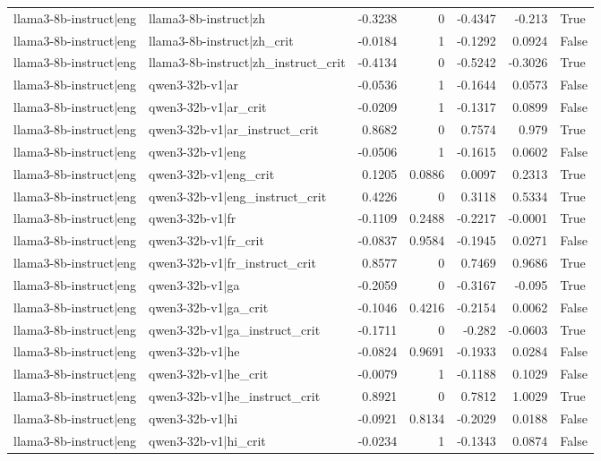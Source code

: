 \begin{table}
\begin{tabular}{l l r r r r l}
llama3-8b-instruct|eng & llama3-8b-instruct|zh & -0.3238 & 0 & -0.4347 & -0.213 & True \\
llama3-8b-instruct|eng & llama3-8b-instruct|zh_crit & -0.0184 & 1 & -0.1292 & 0.0924 & False \\
llama3-8b-instruct|eng & llama3-8b-instruct|zh_instruct_crit & -0.4134 & 0 & -0.5242 & -0.3026 & True \\
llama3-8b-instruct|eng & qwen3-32b-v1|ar & -0.0536 & 1 & -0.1644 & 0.0573 & False \\
llama3-8b-instruct|eng & qwen3-32b-v1|ar_crit & -0.0209 & 1 & -0.1317 & 0.0899 & False \\
llama3-8b-instruct|eng & qwen3-32b-v1|ar_instruct_crit & 0.8682 & 0 & 0.7574 & 0.979 & True \\
llama3-8b-instruct|eng & qwen3-32b-v1|eng & -0.0506 & 1 & -0.1615 & 0.0602 & False \\
llama3-8b-instruct|eng & qwen3-32b-v1|eng_crit & 0.1205 & 0.0886 & 0.0097 & 0.2313 & True \\
llama3-8b-instruct|eng & qwen3-32b-v1|eng_instruct_crit & 0.4226 & 0 & 0.3118 & 0.5334 & True \\
llama3-8b-instruct|eng & qwen3-32b-v1|fr & -0.1109 & 0.2488 & -0.2217 & -0.0001 & True \\
llama3-8b-instruct|eng & qwen3-32b-v1|fr_crit & -0.0837 & 0.9584 & -0.1945 & 0.0271 & False \\
llama3-8b-instruct|eng & qwen3-32b-v1|fr_instruct_crit & 0.8577 & 0 & 0.7469 & 0.9686 & True \\
llama3-8b-instruct|eng & qwen3-32b-v1|ga & -0.2059 & 0 & -0.3167 & -0.095 & True \\
llama3-8b-instruct|eng & qwen3-32b-v1|ga_crit & -0.1046 & 0.4216 & -0.2154 & 0.0062 & False \\
llama3-8b-instruct|eng & qwen3-32b-v1|ga_instruct_crit & -0.1711 & 0 & -0.282 & -0.0603 & True \\
llama3-8b-instruct|eng & qwen3-32b-v1|he & -0.0824 & 0.9691 & -0.1933 & 0.0284 & False \\
llama3-8b-instruct|eng & qwen3-32b-v1|he_crit & -0.0079 & 1 & -0.1188 & 0.1029 & False \\
llama3-8b-instruct|eng & qwen3-32b-v1|he_instruct_crit & 0.8921 & 0 & 0.7812 & 1.0029 & True \\
llama3-8b-instruct|eng & qwen3-32b-v1|hi & -0.0921 & 0.8134 & -0.2029 & 0.0188 & False \\
llama3-8b-instruct|eng & qwen3-32b-v1|hi_crit & -0.0234 & 1 & -0.1343 & 0.0874 & False \\

\end{tabular}
\end{table}
